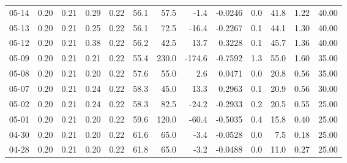 \begin{threeparttable}
{\begin{tabular}{lrrrrrrrrrrrr}
  05-14 &          0.20 &          0.21 &          0.29 &        0.22 &                56.1 &                57.5 &       -1.4 &      -0.0246 &                 0.0 &             41.8 &            1.22 &                  40.00 \\
  05-13 &          0.20 &          0.21 &          0.25 &        0.22 &                56.1 &                72.5 &      -16.4 &      -0.2267 &                 0.1 &             44.1 &            1.30 &                  40.00 \\
  05-12 &          0.20 &          0.21 &          0.38 &        0.22 &                56.2 &                42.5 &       13.7 &       0.3228 &                 0.1 &             45.7 &            1.36 &                  40.00 \\
  05-09 &          0.20 &          0.21 &          0.21 &        0.22 &                55.4 &               230.0 &     -174.6 &      -0.7592 &                 1.3 &             55.0 &            1.60 &                  35.00 \\
  05-08 &          0.20 &          0.21 &          0.20 &        0.22 &                57.6 &                55.0 &        2.6 &       0.0471 &                 0.0 &             20.8 &            0.56 &                  35.00 \\
  05-07 &          0.20 &          0.21 &          0.24 &        0.22 &                58.3 &                45.0 &       13.3 &       0.2963 &                 0.1 &             20.9 &            0.56 &                  30.00 \\
  05-02 &          0.20 &          0.21 &          0.24 &        0.22 &                58.3 &                82.5 &      -24.2 &      -0.2933 &                 0.2 &             20.5 &            0.55 &                  25.00 \\
  05-01 &          0.20 &          0.21 &          0.20 &        0.22 &                59.6 &               120.0 &      -60.4 &      -0.5035 &                 0.4 &             15.8 &            0.40 &                  25.00 \\
  04-30 &          0.20 &          0.21 &          0.20 &        0.22 &                61.6 &                65.0 &       -3.4 &      -0.0528 &                 0.0 &              7.5 &            0.18 &                  25.00 \\
  04-28 &          0.20 &          0.21 &          0.20 &        0.22 &                61.8 &                65.0 &       -3.2 &      -0.0488 &                 0.0 &             11.0 &            0.27 &                  25.00 \\

\end{tabular}}
\end{threeparttable}
